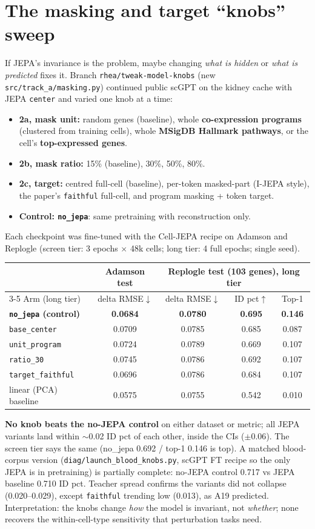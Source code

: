 \documentclass[11pt]{article}
\newcommand{\code}[1]{\texttt{\small #1}}
\newcommand{\up}{$\uparrow$}
\newcommand{\down}{$\downarrow$}
\begin{document}
\section{The masking and target ``knobs'' sweep}
If JEPA's invariance is the problem, maybe changing \emph{what is hidden} or \emph{what is predicted} fixes it. Branch \code{rhea/tweak-model-knobs} (new \code{src/track\_a/masking.py}) continued public scGPT on the kidney cache with JEPA \code{center} and varied one knob at a time:
\begin{itemize}
\item \textbf{2a, mask unit:} random genes (baseline), whole \textbf{co-expression programs} (clustered from training cells), whole \textbf{MSigDB Hallmark pathways}, or the cell's \textbf{top-expressed genes}.
\item \textbf{2b, mask ratio:} 15\% (baseline), 30\%, 50\%, 80\%.
\item \textbf{2c, target:} centred full-cell (baseline), per-token masked-part (I-JEPA style), the paper's \code{faithful} full-cell, and program masking + token target.
\item \textbf{Control: \code{no\_jepa}}: same pretraining with reconstruction only.
\end{itemize}
Each checkpoint was fine-tuned with the Cell-JEPA recipe on Adamson and Replogle (screen tier: 3 epochs $\times$ 48k cells; long tier: 4 full epochs; single seed).
\begin{center}\small
\begin{tabular}{lcccc}
\toprule
 & Adamson test & \multicolumn{3}{c}{Replogle test (103 genes), long tier}\\
\cmidrule(lr){3-5}
Arm (long tier) & delta RMSE\down & delta RMSE\down & ID pct\up & Top-1\\
\midrule
\textbf{\code{no\_jepa} (control)} & \textbf{0.0684} & \textbf{0.0780} & \textbf{0.695} & \textbf{0.146}\\
\code{base\_center} & 0.0709 & 0.0785 & 0.685 & 0.087\\
\code{unit\_program} & 0.0724 & 0.0789 & 0.669 & 0.107\\
\code{ratio\_30} & 0.0745 & 0.0786 & 0.692 & 0.107\\
\code{target\_faithful} & 0.0696 & 0.0786 & 0.684 & 0.107\\
linear (PCA) baseline & 0.0575 & 0.0755 & 0.542 & 0.010\\
\bottomrule
\end{tabular}
\end{center}
\textbf{No knob beats the no-JEPA control} on either dataset or metric; all JEPA variants land within $\sim$0.02 ID pct of each other, inside the CIs ($\pm 0.06$). The screen tier says the same (no\_jepa 0.692 / top-1 0.146 is top). A matched blood-corpus version (\code{diag/launch\_blood\_knobs.py}, scGPT FT recipe so the only JEPA is in pretraining) is partially complete: no-JEPA control 0.717 vs JEPA baseline 0.710 ID pct. Teacher spread confirms the variants did not collapse (0.020--0.029), except \code{faithful} trending low (0.013), as A19 predicted. Interpretation: the knobs change \emph{how} the model is invariant, not \emph{whether}; none recovers the within-cell-type sensitivity that perturbation tasks need.
\end{document}

